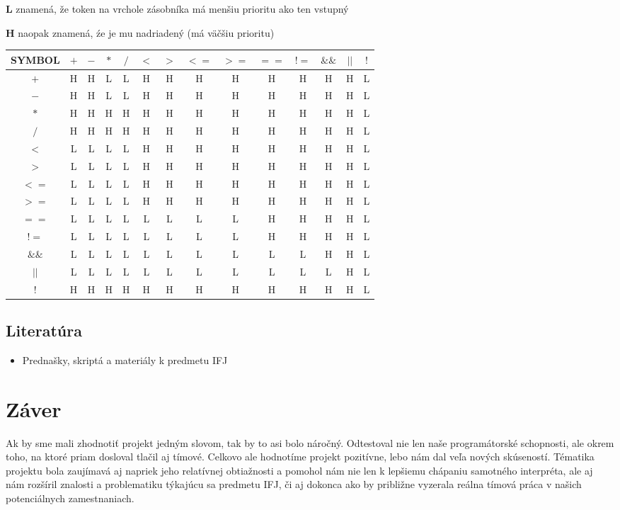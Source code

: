 \documentclass[12pt, a4paper]{article}
\begin{document}
        \textbf{L} znamená, že token na vrchole zásobníka má menšiu prioritu ako ten vstupný

        \textbf{H} naopak znamená, źe je mu nadriadený (má väčšiu prioritu)

        \begin{center}
            \begin{tabular}{| c | c | c | c | c | c | c | c | c | c | c | c | c | c |}
            \hline
            SYMBOL & $+$ & $-$ & $*$ & $/$ & $<$ & $>$ & $<=$ & $>=$ & $==$ & $!=$ & $\&\&$ & $||$ & $!$\\
            \hline
            $+$ & H & H & L & L & H & H & H & H & H & H & H & H & L\\
            $-$ & H & H & L & L & H & H & H & H & H & H & H & H & L\\
            $*$ & H & H & H & H & H & H & H & H & H & H & H & H & L\\
            $/$ & H & H & H & H & H & H & H & H & H & H & H & H & L\\
            $<$ & L & L & L & L & H & H & H & H & H & H & H & H & L\\
            $>$ & L & L & L & L & H & H & H & H & H & H & H & H & L\\
            $<=$ & L & L & L & L & H & H & H & H & H & H & H & H & L\\
            $>=$ & L & L & L & L & H & H & H & H & H & H & H & H & L\\
            $==$ & L & L & L & L & L & L & L & L & H & H & H & H & L\\
            $!=$ & L & L & L & L & L & L & L & L & H & H & H & H & L\\
            $\&\&$ & L & L & L & L & L & L & L & L & L & L & H & H & L\\
            $||$ & L & L & L & L & L & L & L & L & L & L & L & H & L\\
            $!$ & H & H & H & H & H & H & H & H & H & H & H & H & L\\
            \hline
            \end{tabular}
        \end{center}
        \subsection{Literatúra}
        \begin{itemize}
            \item Prednašky, skriptá a materiály k predmetu IFJ
        \end{itemize}
        \newpage
    \section{Záver}
    Ak by sme mali zhodnotiť projekt jedným slovom, tak by to asi bolo náročný. Odtestoval nie len naše programátorské schopnosti, ale okrem toho, na ktoré priam dosloval tlačil aj tímové. Celkovo ale hodnotíme projekt pozitívne, lebo nám dal veľa nových skúseností. Tématika projektu bola zaujímavá aj napriek jeho relatívnej obtiažnosti a pomohol nám nie len k lepšiemu chápaniu samotného interpréta, ale aj nám rozšíril znalosti a problematiku týkajúcu sa predmetu IFJ, či aj dokonca ako by približne vyzerala reálna tímová práca v našich potenciálnych zamestnaniach.
\end{document}
